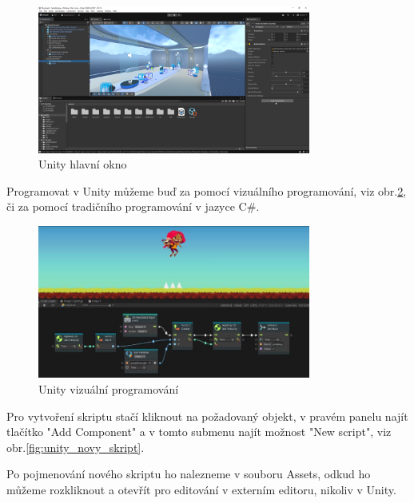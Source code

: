 \documentclass[a4paper,oneside,12pt]{book}
\begin{document}
\begin{figure}[H]
	\centering
	\includegraphics[width=0.8\textwidth]{obrazky/unity_hlavni.png}
	\caption{Unity hlavní okno}
	\label{fig:unity_hlavni_okno}
\end{figure}

Programovat v Unity můžeme buď za pomocí vizuálního programování, viz obr.\ref{fig:unity_vizualni}, či za pomocí tradičního programování v jazyce C\#.

\begin{figure}[H]
	\centering
	\includegraphics[width=0.8\textwidth]{obrazky/unity_vizualni_programovani.png}
	\caption{Unity vizuální programování}
	\label{fig:unity_vizualni}
\end{figure}
Pro vytvoření skriptu stačí kliknout na požadovaný objekt, v pravém panelu najít tlačítko "Add Component" a v tomto submenu najít možnost "New script", viz obr.\ref{fig:unity_novy_skript}.

Po pojmenování nového skriptu ho nalezneme v souboru Assets, odkud ho můžeme rozkliknout a otevřít pro editování v externím editoru, nikoliv v Unity. 
\end{document}
